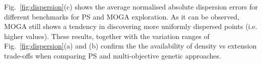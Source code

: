 Fig.~\ref{fig:dispersion}(c) shows the average normalised absolute
dispersion errors for different benchmarks for PS and MOGA
exploration. As it can be observed, MOGA still shows a tendency in
discovering more uniformly dispersed points (i.e. higher values). These results,
together with the variation ranges of Fig.~\ref{fig:dispersion}(a) and
(b) confirm the the availability of density vs extension trade-offs
when comparing PS and multi-objective genetic approaches.

